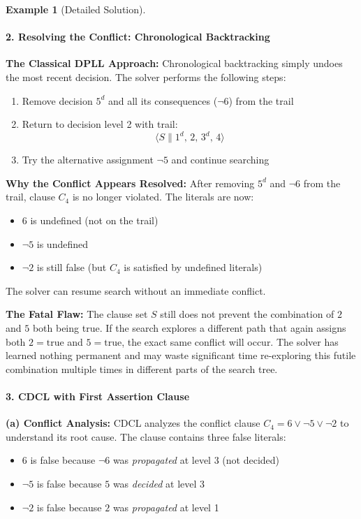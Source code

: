 \documentclass[11pt,a4paper]{article}
\theoremstyle{definition}
\newtheorem{example}{Example}[section]
\theoremstyle{plain}
\theoremstyle{remark}
\begin{document}
\begin{example}[Detailed Solution]
\paragraph{2. Resolving the Conflict: Chronological Backtracking}

\textbf{The Classical DPLL Approach:}
Chronological backtracking simply undoes the most recent decision. The solver performs the following steps:
\begin{enumerate}
    \item Remove decision $5^d$ and all its consequences ($\neg 6$) from the trail
    \item Return to decision level 2 with trail:
    \[
    \langle S \parallel 1^{d},\, 2,\, 3^{d},\, 4 \rangle
    \]
    \item Try the alternative assignment $\neg 5$ and continue searching
\end{enumerate}

\textbf{Why the Conflict Appears Resolved:}
After removing $5^d$ and $\neg 6$ from the trail, clause $C_4$ is no longer violated. The literals are now:
\begin{itemize}
    \item $6$ is undefined (not on the trail)
    \item $\neg 5$ is undefined
    \item $\neg 2$ is still false (but $C_4$ is satisfied by undefined literals)
\end{itemize}
The solver can resume search without an immediate conflict.

\textbf{The Fatal Flaw:}
The clause set $S$ still does not prevent the combination of $2$ and $5$ both being true. If the search explores a different path that again assigns both $2 = \text{true}$ and $5 = \text{true}$, the exact same conflict will occur. The solver has learned nothing permanent and may waste significant time re-exploring this futile combination multiple times in different parts of the search tree.

\paragraph{3. CDCL with First Assertion Clause}

\textbf{(a) Conflict Analysis:}
CDCL analyzes the conflict clause $C_4 = 6 \lor \neg 5 \lor \neg 2$ to understand its root cause. The clause contains three false literals:
\begin{itemize}
    \item $6$ is false because $\neg 6$ was \textit{propagated} at level 3 (not decided)
    \item $\neg 5$ is false because $5$ was \textit{decided} at level 3
    \item $\neg 2$ is false because $2$ was \textit{propagated} at level 1
\end{itemize}


\end{example}
\end{document}
